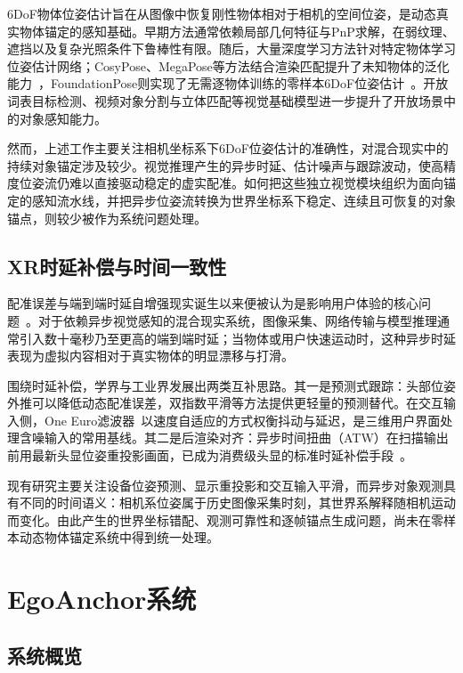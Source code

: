 \documentclass[review]{vgtc}
\begin{document}
6DoF物体位姿估计旨在从图像中恢复刚性物体相对于相机的空间位姿，是动态真实物体锚定的感知基础。早期方法通常依赖局部几何特征与PnP求解，在弱纹理、遮挡以及复杂光照条件下鲁棒性有限。随后，大量深度学习方法针对特定物体学习位姿估计网络；CosyPose、MegaPose等方法结合渲染匹配提升了未知物体的泛化能力~\cite{cosypose2020,megapose2022}，FoundationPose则实现了无需逐物体训练的零样本6DoF位姿估计~\cite{foundationpose2023}。开放词表目标检测、视频对象分割与立体匹配等视觉基础模型进一步提升了开放场景中的对象感知能力。

然而，上述工作主要关注相机坐标系下6DoF位姿估计的准确性，对混合现实中的持续对象锚定涉及较少。视觉推理产生的异步时延、估计噪声与跟踪波动，使高精度位姿流仍难以直接驱动稳定的虚实配准。如何把这些独立视觉模块组织为面向锚定的感知流水线，并把异步位姿流转换为世界坐标系下稳定、连续且可恢复的对象锚点，则较少被作为系统问题处理。

\subsection{XR时延补偿与时间一致性}

配准误差与端到端时延自增强现实诞生以来便被认为是影响用户体验的核心问题~\cite{azuma1994improving,diluca2010latency}。对于依赖异步视觉感知的混合现实系统，图像采集、网络传输与模型推理通常引入数十毫秒乃至更高的端到端时延；当物体或用户快速运动时，这种异步时延表现为虚拟内容相对于真实物体的明显漂移与打滑。

围绕时延补偿，学界与工业界发展出两类互补思路。其一是预测式跟踪：头部位姿外推可以降低动态配准误差，双指数平滑等方法提供更轻量的预测替代。在交互输入侧，One Euro滤波器~\cite{casiez2012oneeuro}以速度自适应的方式权衡抖动与延迟，是三维用户界面处理含噪输入的常用基线。其二是后渲染对齐：异步时间扭曲（ATW）在扫描输出前用最新头显位姿重投影画面，已成为消费级头显的标准时延补偿手段~\cite{vanwaveren2016atw}。

现有研究主要关注设备位姿预测、显示重投影和交互输入平滑，而异步对象观测具有不同的时间语义：相机系位姿属于历史图像采集时刻，其世界系解释随相机运动而变化。由此产生的世界坐标错配、观测可靠性和逐帧锚点生成问题，尚未在零样本动态物体锚定系统中得到统一处理。

\section{EgoAnchor系统}\label{sec:system}

\subsection{系统概览}
\end{document}
